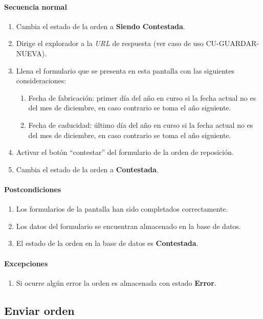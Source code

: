 \paragraph*{Secuencia normal}
\begin{enumerate}
  \item Cambia el estado de la orden a \textbf{Siendo Contestada}.
  \item Dirige el explorador a la \textit{URL} de respuesta (ver caso de uso CU-GUARDAR-NUEVA).
  \item Llena el formulario que se presenta en esta pantalla con las siguientes consideraciones:
  \begin{enumerate}
    \item Fecha de fabricación: primer día del año en curso si la fecha actual no es del mes de diciembre, en caso contrario se toma el año siguiente.
    \item Fecha de caducidad: último día del año en curso si la fecha actual no es del mes de diciembre, en caso contrario se toma el año siguiente.
  \end{enumerate}
  \item Activar el botón ``contestar'' del formulario de la orden de reposición.
  \item Cambia el estado de la orden a \textbf{Contestada}.
\end{enumerate}
\paragraph*{Postcondiciones}
\begin{enumerate}
  \item Los formularios de la pantalla han sido completados correctamente.
  \item Los datos del formulario se encuentran almacenado en la base de datos.
  \item El estado de la orden en la base de datos es \textbf{Contestada}.
\end{enumerate}
\paragraph*{Excepciones}
\begin{enumerate}
  \item Si ocurre algún error la orden es almacenada con estado \textbf{Error}.
\end{enumerate}


\subsection{Enviar orden}
